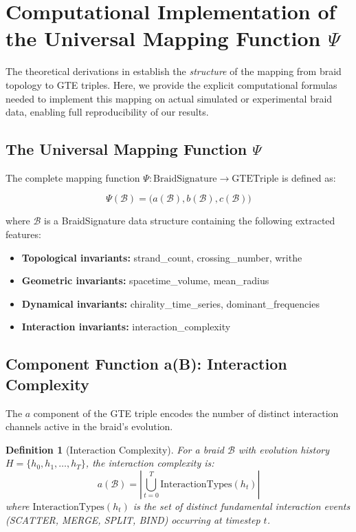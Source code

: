 \documentclass[11pt]{article}
\newtheorem{definition}[theorem]{Definition}
\theoremstyle{remark}
\begin{document}
\section{Computational Implementation of the Universal Mapping Function $\Psi$}
\label{app:psi_implementation}

The theoretical derivations in  establish the \emph{structure} of the mapping from braid topology to GTE triples. Here, we provide the explicit computational formulas needed to implement this mapping on actual simulated or experimental braid data, enabling full reproducibility of our results.

\subsection{The Universal Mapping Function $\Psi$}

The complete mapping function $\Psi: \text{BraidSignature} \to \text{GTETriple}$ is defined as:

\begin{equation}
\Psi(\mathcal{B}) = \big(a(\mathcal{B}), b(\mathcal{B}), c(\mathcal{B})\big)
\label{eq:psi_function}
\end{equation}

where $\mathcal{B}$ is a BraidSignature data structure containing the following extracted features:
\begin{itemize}[leftmargin=1.2em]
    \item \textbf{Topological invariants:} strand\_count, crossing\_number, writhe
    \item \textbf{Geometric invariants:} spacetime\_volume, mean\_radius  
    \item \textbf{Dynamical invariants:} chirality\_time\_series, dominant\_frequencies
    \item \textbf{Interaction invariants:} interaction\_complexity
\end{itemize}

\subsection{Component Function a(B): Interaction Complexity}

The $a$ component of the GTE triple encodes the number of distinct interaction channels active in the braid's evolution.

\begin{definition}[Interaction Complexity]
For a braid $\mathcal{B}$ with evolution history $H = \{h_0, h_1, \ldots, h_T\}$, the interaction complexity is:
\begin{equation}
a(\mathcal{B}) = \left|\bigcup_{t=0}^{T} \text{InteractionTypes}(h_t)\right|
\end{equation}
where $\text{InteractionTypes}(h_t)$ is the set of distinct fundamental interaction events (SCATTER, MERGE, SPLIT, BIND) occurring at timestep $t$.
\end{definition}
\end{document}
